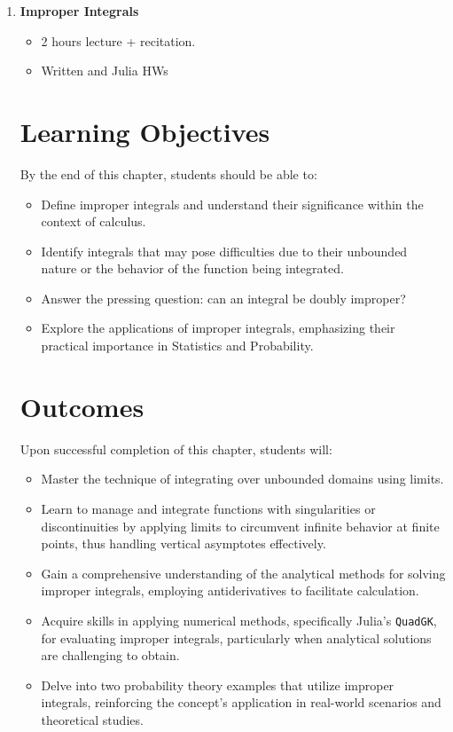 \documentclass[letterpaper]{book}
\begin{document}
\begin{enumerate}[label={\large\arabic*}, font=\large]
\bigskip


\item {\Large \bf Improper Integrals}
\begin{itemize}
    \item 2 hours lecture + recitation.
    \item Written and Julia HWs
\end{itemize}

\section*{Learning Objectives}

By the end of this chapter, students should be able to:
\begin{itemize}
    \item Define improper integrals and understand their significance within the context of calculus.
    \item Identify integrals that may pose difficulties due to their unbounded nature or the behavior of the function being integrated.
    \item  Answer the pressing question: can an integral be doubly improper?
    \item Explore the applications of improper integrals, emphasizing their practical importance in Statistics and Probability.
\end{itemize}

\section*{Outcomes}

Upon successful completion of this chapter, students will:
\begin{itemize}
    \item Master the technique of integrating over unbounded domains using limits.
    \item Learn to manage and integrate functions with singularities or discontinuities by applying limits to circumvent infinite behavior at finite points, thus handling vertical asymptotes effectively.
    \item Gain a comprehensive understanding of the analytical methods for solving improper integrals, employing antiderivatives to facilitate calculation.
    \item Acquire skills in applying numerical methods, specifically Julia's \texttt{QuadGK}, for evaluating improper integrals, particularly when analytical solutions are challenging to obtain.
    \item Delve into two probability theory examples that utilize improper integrals, reinforcing the concept’s application in real-world scenarios and theoretical studies.
\end{itemize}



\end{enumerate}
\end{document}
